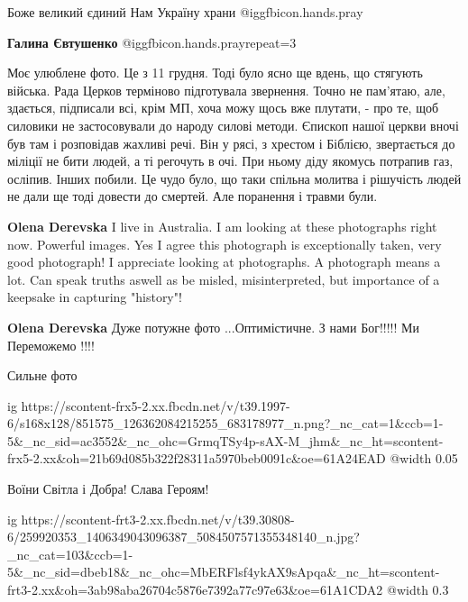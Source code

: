  
 
 
 
 

Боже великий єдиний
Нам Україну храни @igg{fbicon.hands.pray} 

\textbf{Галина Євтушенко}  @igg{fbicon.hands.pray}{repeat=3} 


Моє улюблене фото. Це з 11 грудня. Тоді було ясно ще вдень, що стягують
війська. Рада Церков терміново підготувала звернення. Точно не пам'ятаю, але,
здається, підписали всі, крім МП, хоча можу щось вже плутати, - про те, щоб
силовики не застосовували до народу силові методи. Єпископ нашої церкви вночі
був там і розповідав жахливі речі. Він у рясі, з хрестом і Біблією, звертається
до міліції не бити людей, а ті регочуть в очі. При ньому діду якомусь потрапив
газ, осліпив. Інших побили. Це чудо було, що таки спільна молитва і рішучість
людей не дали ще тоді довести до смертей. Але поранення і травми були.

\begin{itemize} %
\textbf{Olena Derevska} I live in Australia. I am looking at these photographs right now. Powerful images. Yes I agree this photograph is exceptionally taken, very good photograph! I appreciate looking at photographs. A photograph means a lot. Can speak truths aswell as be misled, misinterpreted, but importance of a keepsake in capturing "history"!

\textbf{Olena Derevska} Дуже потужне фото ...Оптимістичне. З нами Бог!!!!! Ми Переможемо !!!!
\end{itemize} %

Сильне фото


\ifcmt
  ig https://scontent-frx5-2.xx.fbcdn.net/v/t39.1997-6/s168x128/851575_126362084215255_683178977_n.png?_nc_cat=1&ccb=1-5&_nc_sid=ac3552&_nc_ohc=GrmqTSy4p-sAX-M_jhm&_nc_ht=scontent-frx5-2.xx&oh=21b69d085b322f28311a5970beb0091c&oe=61A24EAD
  @width 0.05
\fi

Воїни Світла і Добра!
Слава Героям!

\ifcmt
  ig https://scontent-frt3-2.xx.fbcdn.net/v/t39.30808-6/259920353_1406349043096387_5084507571355348140_n.jpg?_nc_cat=103&ccb=1-5&_nc_sid=dbeb18&_nc_ohc=MbERFlsf4ykAX9sApqa&_nc_ht=scontent-frt3-2.xx&oh=3ab98aba26704c5876e7392a77c97e63&oe=61A1CDA2
  @width 0.3
\fi
